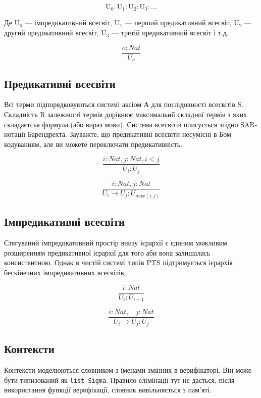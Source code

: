 $$
    \mathrm{U_0} : \mathrm{U}_1 : \mathrm{U}_2 : \mathrm{U}_3 : ...
$$

Де $\mathrm{U_0}$ --- імпредикативний всесвіт,
   $\mathrm{U_1}$ --- перший предикативний всесвіт,
   $\mathrm{U_2}$ --- другий предикативний всесвіт,
   $\mathrm{U_3}$ --- третій предикативний всесвіт і т.д.

\begin{equation}
\tag{S}
\dfrac
{o : Nat}
{U_o}
\end{equation}

\newpage
\subsection*{Предикативні всесвіти}

Всі терми підпорядковуються системі аксіом А для послідовності всесвітів S.
Складність R залежності термів дорівнює максимальнії складної термів з
яких складаєтсья формула (або вираз мови). Система всесвітів описується
згідно SAR-нотації Барендрехта. Зауважте, що предикативні всесвіти
несумісні в Бом кодуванням, але ви можете переключати предикативність.

\[
\tag{$A_1$}
\dfrac{i: Nat, j: Nat, i < j}{U_i : U_j}
\]

\[
\tag{$R_1$}
\dfrac{i : Nat, j : Nat}{U_i \rightarrow U_j : U_{max(i,j)} }
\]

\subsection*{Імпредикативні всесвіти}
Стягуваний імпредикативний простір внизу ієрархії є єдиним можливим розширенням
предикативної ієрархії для того аби вона залишалась консистентною. Однак
в чистій системі типів PTS підтримується ієрархія бескінечних імпредикативних всесвітів.

\begin{equation}
\tag{$A_2$}
\dfrac
{i: Nat}
{U_i : U_{i+1}}
\end{equation}

\begin{equation}
\tag{$R_2$}
\dfrac
{i : Nat,\ \ \ \ j : Nat}
{U_i \rightarrow U_{j} : U_{j}}
\end{equation}

\subsection{Контексти}

Контексти моделюються словником з іменами змінних в верифікаторі.
Він може бути типизований як \lstinline{list Sigma}.
Правило елімінації тут не дається, після використання функції верифікації,
словник вивільняється з пам'яті.


